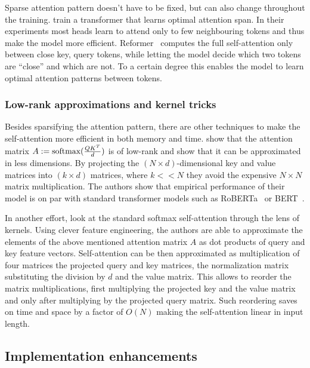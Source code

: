 Sparse attention pattern doesn't have to be fixed, but can also change
throughout the training. \cite{sukhbaatar2019adaptive} train a transformer that
learns optimal attention span. In their experiments most heads learn to attend
only to few neighbouring tokens and thus make the model more efficient.
Reformer~\citep{kitaev2020reformer} computes the full self-attention only between
close key, query tokens, while letting the model decide which two tokens are
``close'' and which are not. To a certain degree this enables the model to learn
optimal attention patterns between tokens.

\subsubsection{Low-rank approximations and kernel tricks}

Besides sparsifying the attention pattern, there are other techniques to make
the self-attention more efficient in both memory and time.
\cite{wang2020linformer} show that the attention matrix $A :=
\operatorname*{\textrm{softmax}}(\frac{QK^T}{d})$ is of low-rank and show that it can be approximated
in less dimensions. By projecting the $(N \times d)$-dimensional key and value
matrices into $(k \times d)$ matrices, where $k << N$ they avoid the expensive
$N\times N$ matrix multiplication. The authors show that empirical performance
of their model is on par with standard transformer models such as
RoBERTa~\citep{liu2019roberta} or BERT~\citep{devlin2019bert}.

In another effort, \cite{choromanski2020rethinking} look at the standard
softmax self-attention through the lens of kernels. Using clever feature
engineering, the authors are able to approximate the elements of the above
mentioned attention matrix $A$ as dot products of query and key feature
vectors. Self-attention can be then approximated as multiplication of four
matrices the projected query and key matrices, the normalization matrix
substituting the division by $d$ and the value matrix. This allows to reorder
the matrix multiplications, first multiplying the projected key and the value
matrix and only after multiplying by the projected query matrix. Such
reordering saves on time and space by a factor of $O(N)$ making the
self-attention linear in input length.

\subsection{Implementation enhancements}


